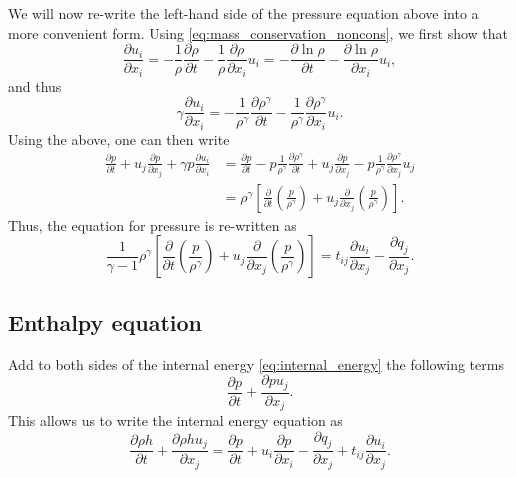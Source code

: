 \documentclass[oneside,a4paper,11pt]{report}
\begin{document}
We will now re-write the left-hand side of the pressure equation above into a more convenient form. Using \cref{eq:mass_conservation_noncons}, we first show that
\begin{equation}
    \frac{\partial u_i}{\partial x_i} = -\frac{1}{\rho} \frac{\partial \rho}{\partial t} - \frac{1}{\rho} \frac{\partial \rho}{\partial x_i}u_i = - \frac{\partial \ln{\rho} }{\partial t} -  \frac{\partial \ln{\rho}}{\partial x_i} u_i,
\end{equation}
and thus
\begin{equation}
    \gamma \frac{\partial u_i}{\partial x_i} = -\frac{1}{\rho^\gamma} \frac{\partial \rho^\gamma}{\partial t} - \frac{1}{\rho^\gamma} \frac{\partial \rho^\gamma}{\partial x_i} u_i.
\end{equation}
Using the above, one can then write
\begin{align}
    \frac{\partial p}{\partial t} + u_j\frac{\partial p}{\partial x_j} +\gamma p \frac{\partial u_i}{\partial x_i} 
    &= \frac{\partial p}{\partial t} - p \frac{1}{\rho^\gamma} \frac{\partial \rho^\gamma}{\partial t} + u_j \frac{\partial p}{\partial x_j} - p \frac{1}{\rho^\gamma} \frac{\partial \rho^\gamma}{\partial x_j} u_j \nonumber \\
    & = \rho^\gamma \left [ \frac{\partial}{\partial t} \left ( \frac{p}{\rho^\gamma} \right) + u_j \frac{\partial}{\partial x_j} \left (\frac{p}{\rho^\gamma} \right ) \right ].
\end{align}
Thus, the equation for pressure is re-written as
\begin{equation}
\label{eq:energy_form_pressure_2}
    \frac{1}{\gamma - 1} \rho^\gamma \left [ \frac{\partial}{\partial t} \left ( \frac{p}{\rho^\gamma} \right) + u_j \frac{\partial}{\partial x_j} \left (\frac{p}{\rho^\gamma} \right ) \right ] = t_{ij} \frac{\partial u_i}{\partial x_j} - \frac{\partial q_j}{\partial x_j}.
\end{equation}
\subsection{Enthalpy equation} 
Add to both sides of the internal energy \cref{eq:internal_energy} the following terms
\begin{equation}
    \frac{\partial p}{\partial t} + \frac{\partial p u_j}{\partial x_j}.
\end{equation}
This allows us to write the internal energy equation as
\begin{equation}
\label{eq:energy_form_enthalpy}
\frac{ \partial \rho h}{\partial t} + \frac{\partial \rho h u_j}{\partial x_j} =  \frac{\partial p}{\partial t} + u_i \frac{\partial p}{\partial x_i} - \frac{\partial q_j}{\partial x_j} + t_{ij} \frac{\partial u_i}{\partial x_j}.
\end{equation}
\end{document}
